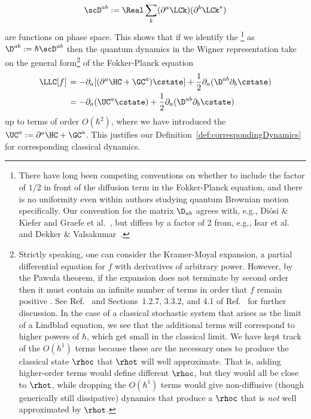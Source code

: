 \documentclass{article}
\numberwithin{equation}{section}
\begin{document}
\begin{align}\label{eq:delta-def-appendix}
    \scD^{ab} := \Real \sum_k(\partial^a \LCk)(\partial^b \LCk^*)
\end{align}
are functions on phase space.   
This shows that if we identify the \footnote{There have long been competing \cite{risken1984fokkerplanck} conventions \cite{gardiner2009stochastic} on whether to include the factor of $1/2$ in front of the diffusion term in the Fokker-Planck equation, and there is no uniformity even within authors studying quantum Brownian motion specifically.  Our convention for the matrix $\D_{ab}$ agrees with, e.g., Di\'{o}si \& Kiefer \cite{diosi2000robustness, diosi2002exact} and Graefe et al.\ \cite{graefe2018lindblad}, but differs by a factor of 2 from, e.g., Isar et al.~\cite{isar1994open} and Dekker \& Valsakumar~\cite{dekker1984fundamental}.}  as $\D^{ab} :=  \hbar\scD^{ab}$ then the quantum dynamics in the Wigner representation take on the general form\footnote{Strictly speaking, one can consider the Kramer-Moyal expansion, a partial differential equation for $f$ with derivatives of arbitrary power.  However, by the Pawula theorem, if the expansion does not terminate by second order then it must contain an infinite number of terms in order that $f$ remain positive \cite{pawula1967approximation}. See Ref.~\cite{pawula1965generalizations} and Sections~1.2.7, 3.3.2, and 4.1 of Ref.~\cite{risken1984fokkerplanck} for further discussion.  In the case of a classical stochastic system that arises as the limit of a Lindblad equation, we see that the additional terms will correspond to higher powers of $\hbar$, which get small in the classical limit.  We have kept track of the $O(\hbar^1)$ terms because these are the necessary ones to produce the classical state $\rhoc$ that $\rhot$ will well approximate.  That is, adding higher-order terms would define different $\rhoc$, but they would all be close to $\rhot$, while dropping the $O(\hbar^1)$ terms would give non-diffusive (though generically still dissipative) dynamics that produce a $\rhoc$ that is \emph{not} well approximated by $\rhot$.} of the Fokker-Planck equation \cite{risken1984fokkerplanck, gardiner2009stochastic}
\begin{align}\label{eq:fokker-planck-appendix}
    \LLC [f] 
    \, &= -\partial_a [(\partial^a\HC + \GC^a) \cstate]  +	\frac{1}{2} \partial_a ( \D^{ab} \partial_b \cstate)\\
    \label{eq:def-deterministic-drift}
    &= -\partial_a (\UC^a \cstate) +	\frac{1}{2} \partial_a ( \D^{ab} \partial_b \cstate)
\end{align}
up to terms of order $O(\hbar^2)$, where we have introduced the  $\UC^a := \partial^a \HC +  \GC^a$. This justifies our Definition~\ref{def:correspondingDynamics} for corresponding classical dynamics.
\end{document}
